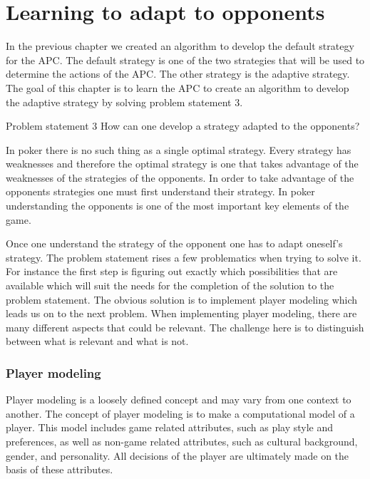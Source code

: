 \section{Learning to adapt to opponents}
\label{sec:part3}

In the previous chapter we created an algorithm to develop the default strategy for the APC. The default strategy is one of the two strategies that will be used to determine the actions of the APC. The other strategy is the adaptive strategy. \\

The goal of this chapter is to learn the APC to create an algorithm to develop the adaptive strategy by solving problem statement 3.

\vspace{4mm}
\begin{statementBox2}{Problem statement 3}
  How can one develop a strategy adapted to the opponents?
\end{statementBox2}
\vspace{4mm} 

In poker there is no such thing as a single optimal strategy. Every strategy has weaknesses and therefore the optimal strategy is one that takes advantage of the weaknesses of the strategies of the opponents. In order to take advantage of the opponents strategies one must first understand their strategy. In poker understanding the opponents is one of the most important key elements of the game. 

Once one understand the strategy of the opponent one has to adapt oneself's strategy.
The problem statement rises a few problematics when trying to solve it. For instance the first step is figuring out exactly which possibilities that are available which will suit the needs for the completion of the solution to the problem statement. The obvious solution is to implement player modeling which leads us on to the next problem.
When implementing player modeling, there are many different aspects that could be relevant. The challenge here is to distinguish  between what is relevant and what is not.



\subsubsection{Player modeling}
Player modeling is a loosely defined concept and may vary from one context to another. The concept of player modeling is to make a computational model of a player. This model includes game related attributes, such as play style and preferences, as well as non-game related attributes, such as cultural background, gender, and personality. All decisions of the player are ultimately made on the basis of these attributes. 

